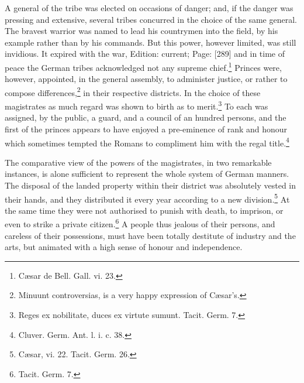 A general of the tribe was elected on occasions of danger; and, if the danger was pressing and extensive, several tribes concurred in the choice of the same general. The bravest warrior was named to lead his countrymen into the field, by his example rather than by his commands. But this power, however limited, was still invidious. It expired with the war, Edition: current; Page: [289] and in time of peace the German tribes acknowledged not any supreme chief.\footnote{Cæsar de Bell. Gall. vi. 23.} Princes were, however, appointed, in the general assembly, to administer justice, or rather to compose differences,\footnote{Minuunt controversias, is a very happy expression of Cæsar\texthebrew{}’s.} in their respective districts. In the choice of these magistrates as much regard was shown to birth as to merit.\footnote{Reges ex nobilitate, duces ex virtute sumunt. Tacit. Germ. 7.} To each was assigned, by the public, a guard, and a council of an hundred persons, and the first of the princes appears to have enjoyed a pre-eminence of rank and honour which sometimes tempted the Romans to compliment him with the regal title.\footnote{Cluver. Germ. Ant. l. i. c. 38.}

The comparative view of the powers of the magistrates, in two remarkable instances, is alone sufficient to represent the whole system of German manners. The disposal of the landed property within their district was absolutely vested in their hands, and they distributed it every year according to a new division.\footnote{Cæsar, vi. 22. Tacit. Germ. 26.} At the same time they were not authorised to punish with death, to imprison, or even to strike a private citizen.\footnote{Tacit. Germ. 7.} A people thus jealous of their persons, and careless of their possessions, must have been totally destitute of industry and the arts, but animated with a high sense of honour and independence.

